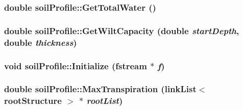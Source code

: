 \label{classsoil_profile_a3a8791cd9244ae7c70246be2e5a27b02}
\hypertarget{classsoil_profile_a25cf83f98b4a58017331dbf78ee31824}{
\subsubsection[{GetTotalWater}]{\setlength{\rightskip}{0pt plus 5cm}double soilProfile::GetTotalWater ()}}
\label{classsoil_profile_a25cf83f98b4a58017331dbf78ee31824}
\hypertarget{classsoil_profile_a1ff69f03ceffe60204f25f0fd73b2e07}{
\subsubsection[{GetWiltCapacity}]{\setlength{\rightskip}{0pt plus 5cm}double soilProfile::GetWiltCapacity (double {\em startDepth}, \/  double {\em thickness})}}
\label{classsoil_profile_a1ff69f03ceffe60204f25f0fd73b2e07}
\hypertarget{classsoil_profile_af06cdd8163adae8f60c89365e242f189}{
\subsubsection[{Initialize}]{\setlength{\rightskip}{0pt plus 5cm}void soilProfile::Initialize (fstream $\ast$ {\em f})}}
\label{classsoil_profile_af06cdd8163adae8f60c89365e242f189}
\hypertarget{classsoil_profile_a92e15c837353821cbb06c51bb3fd542b}{
\subsubsection[{MaxTranspiration}]{\setlength{\rightskip}{0pt plus 5cm}double soilProfile::MaxTranspiration ({\bf linkList}$<$ {\bf rootStructure} $>$ $\ast$ {\em rootList})}}
\label{classsoil_profile_a92e15c837353821cbb06c51bb3fd542b}
